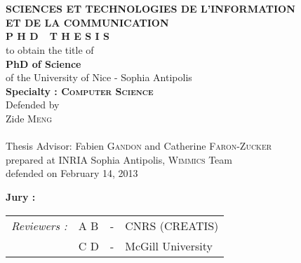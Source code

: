 \begin{titlepage}
\begin{center}
 \\
\vspace*{0.3cm}
 \\
\noindent \textbf{SCIENCES ET TECHNOLOGIES DE L'INFORMATION \\ ET DE LA COMMUNICATION} \\
\vspace*{0.5cm}
\noindent \Huge \textbf{P H D\ \ T H E S I S} \\
\vspace*{0.3cm}
\noindent \large {to obtain the title of} \\
\vspace*{0.3cm}
\noindent \LARGE \textbf{PhD of Science} \\
\vspace*{0.3cm}
\noindent \Large of the University of Nice - Sophia Antipolis \\
\noindent \Large \textbf{Specialty : \textsc{Computer Science}}\\
\vspace*{0.4cm}
\noindent \large {Defended by\\}
\noindent \LARGE Zide \textsc{Meng} \\
\vspace*{0.8cm}
\\
\vspace*{0.8cm}
\noindent \Large Thesis Advisor: Fabien \textsc{Gandon} and Catherine \textsc{Faron-Zucker} \\
\vspace*{0.2cm}
\noindent \Large prepared at INRIA Sophia Antipolis, \textsc{Wimmics} Team\\
\vspace*{0.2cm}
\noindent \large defended on February 14, 2013 \\
\vspace*{0.5cm}
\end{center}
\noindent \large \textbf{Jury :} \\
\begin{center}
\noindent \large 
\begin{tabular}{llcl}
      \textit{Reviewers :}	& A \textsc{B}		& - & CNRS (CREATIS)\\
				& C \textsc{D}		& - & McGill University\\

\end{tabular}
\end{center}
\end{titlepage}
